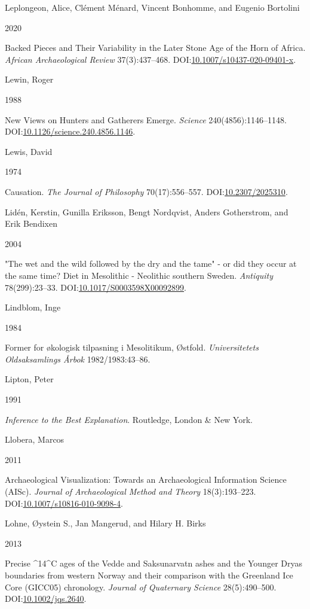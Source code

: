 \documentclass[
  12pt,
  a4paper,
  oneside]{book}
\newlength{\cslhangindent}
\newlength{\csllabelwidth}
\newlength{\cslentryspacingunit} %
\newenvironment{CSLReferences}[2] %
 {%
  \setlength{\parindent}{0pt}
  \ifodd #1
  \let\oldpar\par
  \def\par{\hangindent=\cslhangindent\oldpar}
  \fi
  \setlength{\parskip}{#2\cslentryspacingunit}
 }%
 {}
\newcommand{\CSLBlock}[1]{#1\hfill\break}
\newcommand{\CSLLeftMargin}[1]{\parbox[t]{\csllabelwidth}{#1}}
\newcommand{\CSLRightInline}[1]{\parbox[t]{\linewidth - \csllabelwidth}{#1}\break}
\begin{document}
\begin{CSLReferences}{0}{0}
\leavevmode{}%
\CSLBlock{Leplongeon, Alice, Clément Ménard, Vincent Bonhomme, and Eugenio Bortolini}
\CSLLeftMargin{ 2020}
\CSLRightInline{{Backed Pieces and Their Variability in the Later Stone Age of the Horn of Africa}. \emph{African Archaeological Review} 37(3):437--468. DOI:\href{https://doi.org/10.1007/s10437-020-09401-x}{10.1007/s10437-020-09401-x}.}

\leavevmode{}%
\CSLBlock{Lewin, Roger}
\CSLLeftMargin{ 1988}
\CSLRightInline{{New Views on Hunters and Gatherers Emerge}. \emph{Science} 240(4856):1146--1148. DOI:\href{https://doi.org/10.1126/science.240.4856.1146}{10.1126/science.240.4856.1146}.}

\leavevmode{}%
\CSLBlock{Lewis, David}
\CSLLeftMargin{ 1974}
\CSLRightInline{Causation. \emph{The Journal of Philosophy} 70(17):556--557. DOI:\href{https://doi.org/10.2307/2025310}{10.2307/2025310}.}

\leavevmode{}%
\CSLBlock{Lidén, Kerstin, Gunilla Eriksson, Bengt Nordqvist, Anders Gotherstrom, and Erik Bendixen}
\CSLLeftMargin{ 2004}
\CSLRightInline{"The wet and the wild followed by the dry and the tame" - or did they occur at the same time? Diet in Mesolithic - Neolithic southern Sweden. \emph{Antiquity} 78(299):23--33. DOI:\href{https://doi.org/10.1017/S0003598X00092899}{10.1017/S0003598X00092899}.}

\leavevmode{}%
\CSLBlock{Lindblom, Inge}
\CSLLeftMargin{ 1984}
\CSLRightInline{{Former for økologisk tilpasning i Mesolitikum, Østfold}. \emph{Universitetets Oldsaksamlings Årbok} 1982/1983:43--86.}

\leavevmode{}%
\CSLBlock{Lipton, Peter}
\CSLLeftMargin{ 1991}
\CSLRightInline{\emph{{Inference to the Best Explanation}}. Routledge, London \& New York.}

\leavevmode{}%
\CSLBlock{Llobera, Marcos}
\CSLLeftMargin{ 2011}
\CSLRightInline{{Archaeological Visualization: Towards an Archaeological Information Science (AISc)}. \emph{Journal of Archaeological Method and Theory} 18(3):193--223. DOI:\href{https://doi.org/10.1007/s10816-010-9098-4}{10.1007/s10816-010-9098-4}.}

\leavevmode{}%
\CSLBlock{Lohne, Øystein S., Jan Mangerud, and Hilary H. Birks}
\CSLLeftMargin{ 2013}
\CSLRightInline{{Precise \^{}14\^{}C ages of the Vedde and Saksunarvatn ashes and the Younger Dryas boundaries from western Norway and their comparison with the Greenland Ice Core (GICC05) chronology}. \emph{Journal of Quaternary Science} 28(5):490--500. DOI:\href{https://doi.org/10.1002/jqs.2640}{10.1002/jqs.2640}.}


\end{CSLReferences}
\end{document}
